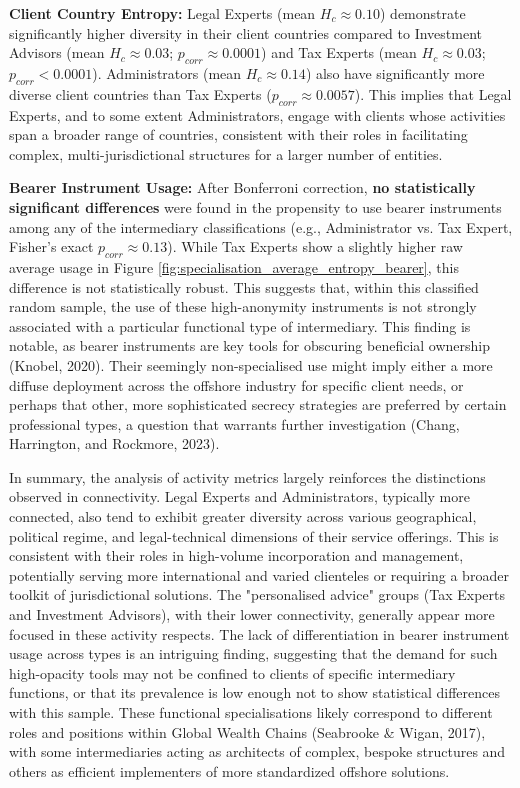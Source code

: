 \textbf{Client Country Entropy:}
Legal Experts (mean $H_c \approx 0.10$) demonstrate significantly higher diversity in their client countries compared to Investment Advisors (mean $H_c \approx 0.03$; $p_{corr} \approx 0.0001$) and Tax Experts (mean $H_c \approx 0.03$; $p_{corr} < 0.0001$). Administrators (mean $H_c \approx 0.14$) also have significantly more diverse client countries than Tax Experts ($p_{corr} \approx 0.0057$). This implies that Legal Experts, and to some extent Administrators, engage with clients whose activities span a broader range of countries, consistent with their roles in facilitating complex, multi-jurisdictional structures for a larger number of entities.

\textbf{Bearer Instrument Usage:}
After Bonferroni correction, \textbf{no statistically significant differences} were found in the propensity to use bearer instruments among any of the intermediary classifications (e.g., Administrator vs. Tax Expert, Fisher's exact $p_{corr} \approx 0.13$). While Tax Experts show a slightly higher raw average usage in Figure \ref{fig:specialisation_average_entropy_bearer}, this difference is not statistically robust. This suggests that, within this classified random sample, the use of these high-anonymity instruments is not strongly associated with a particular functional type of intermediary. This finding is notable, as bearer instruments are key tools for obscuring beneficial ownership (Knobel, 2020). Their seemingly non-specialised use might imply either a more diffuse deployment across the offshore industry for specific client needs, or perhaps that other, more sophisticated secrecy strategies are preferred by certain professional types, a question that warrants further investigation (Chang, Harrington, and Rockmore, 2023).

In summary, the analysis of activity metrics largely reinforces the distinctions observed in connectivity. Legal Experts and Administrators, typically more connected, also tend to exhibit greater diversity across various geographical, political regime, and legal-technical dimensions of their service offerings. This is consistent with their roles in high-volume incorporation and management, potentially serving more international and varied clienteles or requiring a broader toolkit of jurisdictional solutions. The "personalised advice" groups (Tax Experts and Investment Advisors), with their lower connectivity, generally appear more focused in these activity respects. The lack of differentiation in bearer instrument usage across types is an intriguing finding, suggesting that the demand for such high-opacity tools may not be confined to clients of specific intermediary functions, or that its prevalence is low enough not to show statistical differences with this sample. These functional specialisations likely correspond to different roles and positions within Global Wealth Chains (Seabrooke \& Wigan, 2017), with some intermediaries acting as architects of complex, bespoke structures and others as efficient implementers of more standardized offshore solutions.


